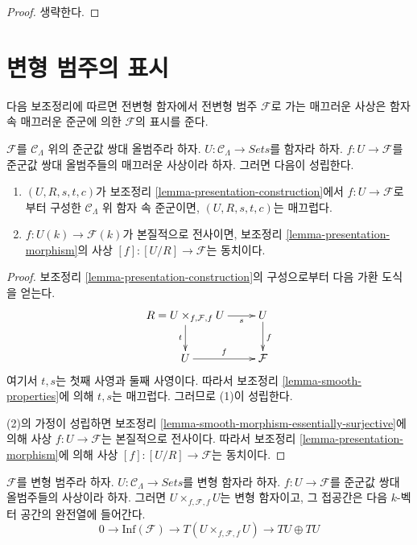 \begin{proof}
생략한다.
\end{proof}





\section{변형 범주의 표시}
\label{section-presentation-deformation-categories}

\noindent
다음 보조정리에 따르면 전변형 함자에서 전변형 범주 $\mathcal{F}$로 가는
매끄러운 사상은 함자 속 매끄러운 준군에 의한
$\mathcal{F}$의 표시를 준다.

\begin{lemma}
\label{lemma-smooth-groupoid-in-functors-construction}
$\mathcal{F}$를 $\mathcal{C}_\Lambda$ 위의 준군값 쌍대 올범주라 하자.
$U : \mathcal{C}_\Lambda \to \textit{Sets}$를 함자라 하자.
$f : U \to \mathcal{F}$를 준군값 쌍대 올범주들의 매끄러운 사상이라 하자.
그러면 다음이 성립한다.
\begin{enumerate}
\item $(U, R, s, t, c)$가 보조정리
\ref{lemma-presentation-construction}에서 $f : U \to \mathcal{F}$로부터
구성한 $\mathcal{C}_\Lambda$ 위 함자 속 준군이면,
$(U, R, s, t, c)$는 매끄럽다.
\item $f : U(k) \to \mathcal{F}(k)$가 본질적으로 전사이면,
보조정리 \ref{lemma-presentation-morphism}의 사상
$[f] : [U/R] \to \mathcal{F}$는 동치이다.
\end{enumerate}
\end{lemma}

\begin{proof}
보조정리 \ref{lemma-presentation-construction}의 구성으로부터
다음 가환 도식을 얻는다.
$$
\xymatrix{
R = U \times_{f, \mathcal{F}, f} U \ar[r]_-s \ar[d]_t & U
\ar[d]^f \\
U \ar[r]^f & \mathcal{F}
}
$$
여기서 $t, s$는 첫째 사영과 둘째 사영이다. 따라서 보조정리
\ref{lemma-smooth-properties}에 의해 $t, s$는 매끄럽다.
그러므로 (1)이 성립한다.

\medskip\noindent
(2)의 가정이 성립하면 보조정리
\ref{lemma-smooth-morphism-essentially-surjective}에 의해
사상 $f : U \to \mathcal{F}$는 본질적으로 전사이다. 따라서 보조정리
\ref{lemma-presentation-morphism}에 의해 사상
$[f] : [U/R] \to \mathcal{F}$는 동치이다.
\end{proof}

\begin{lemma}
\label{lemma-deformation-functor-diagonal}
$\mathcal{F}$를 변형 범주라 하자.
$U : \mathcal{C}_\Lambda \to \textit{Sets}$를 변형 함자라 하자.
$f: U \to \mathcal{F}$를 준군값 쌍대 올범주들의 사상이라 하자.
그러면 $U \times_{f, \mathcal{F}, f} U$는 변형 함자이고,
그 접공간은 다음 $k$-벡터 공간의 완전열에 들어간다.
$$
0 \to \text{Inf}(\mathcal{F}) \to
T(U \times_{f, \mathcal{F}, f} U) \to TU \oplus TU
$$
\end{lemma}

